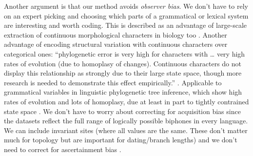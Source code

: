 \documentclass[]{article}
\begin{document}
Another argument is that our method avoids \emph{observer bias}. We don't have to rely on an expert picking and choosing which parts of a grammatical or lexical system are interesting and worth coding. This is described as an advantage of large-scale extraction of continuous morphological characters in biology too \autocite{wright_systematists_2019}. Another advantage of encoding structural variation with continuous characters over categorical ones: ``phylogenetic error is very high for characters with \ldots{} very high rates of evolution (due to homoplasy of changes). Continuous characters do not display this relationship as strongly due to their large state space, though more research is needed to demonstrate this effect empirically.'' \autocite{wright_bayesian_2014}. Applicable to grammatical variables in linguistic phylogenetic tree inference, which show high rates of evolution and lots of homoplasy, due at least in part to tightly contrained state space \autocite{greenhill_evolutionary_2017}. We don't have to worry about correcting for acquisition bias since the datasets reflect the full range of logically possible biphones in every language. We can include invariant sites (where all values are the same. These don't matter much for topology but are important for dating/branch lengths) and we don't need to correct for ascertainment bias \autocite{leache_short_2015}.
\end{document}
